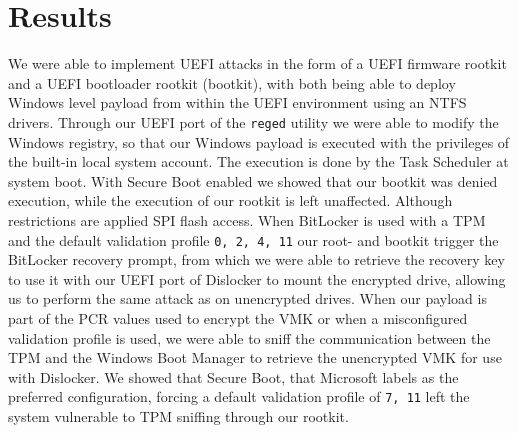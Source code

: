 
\chapter{Results}

We were able to implement \ac{UEFI} attacks in the form of a \ac{UEFI} firmware rootkit and a \ac{UEFI} bootloader rootkit (bootkit), with both being able to deploy Windows level payload from within the \ac{UEFI} environment using an \ac{NTFS} drivers.
Through our \ac{UEFI} port of the \lstinline{reged} utility we were able to modify the Windows registry, so that our Windows payload is executed with the privileges of the built-in local system account.
The execution is done by the Task Scheduler at system boot.
With Secure Boot enabled we showed that our bootkit was denied execution, while the execution of our rootkit is left unaffected.
Although restrictions are applied \ac{SPI} flash access.
When BitLocker is used with a \ac{TPM} and the default validation profile \lstinline{0, 2, 4, 11} our root- and bootkit trigger the BitLocker recovery prompt, from which we were able to retrieve the recovery key to use it with our \ac{UEFI} port of Dislocker to mount the encrypted drive, allowing us to perform the same attack as on unencrypted drives.
When our payload is part of the \ac{PCR} values used to encrypt the \ac{VMK} or when a misconfigured validation profile is used, we were able to sniff the communication between the \ac{TPM} and the Windows Boot Manager to retrieve the unencrypted \ac{VMK} for use with Dislocker.
We showed that Secure Boot, that Microsoft labels as the preferred configuration, forcing a default validation profile of \lstinline{7, 11} left the system vulnerable to \ac{TPM} sniffing through our rootkit.